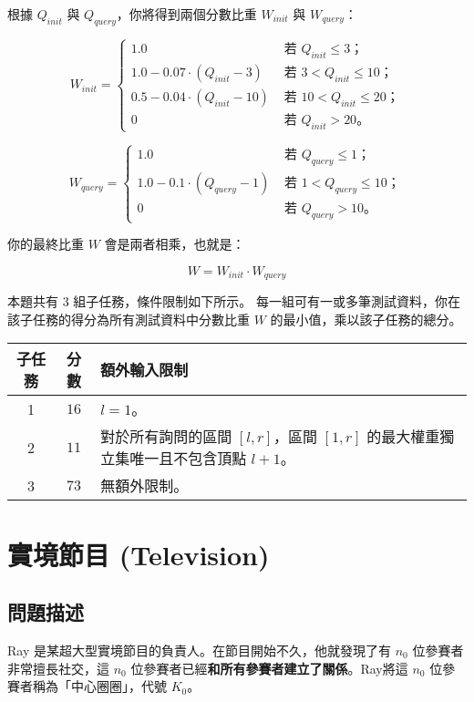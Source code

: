 根據 \(Q_{init}\) 與 \(Q_{query}\)，你將得到兩個分數比重 \(W_{init}\) 與
\(W_{query}\)：

\[
  W_{init} = \begin{cases}
  1.0 & \text{ 若 $Q_{init}\le 3$；}\\
  1.0 - 0.07 \cdot (Q_{init} - 3) & \text{ 若 $3 < Q_{init} \le 10$；}\\
  0.5 - 0.04 \cdot (Q_{init} - 10) & \text{ 若 $10 < Q_{init} \le 20$；}\\
  0 & \text{ 若 $Q_{init} > 20$。}
  \end{cases}
\]

\[
  W_{query} = \begin{cases}
  1.0 & \text{ 若 $Q_{query}\le 1$；}\\
  1.0 - 0.1 \cdot (Q_{query} - 1) & \text{ 若 $1 < Q_{query} \le 10$；}\\
  0 & \text{ 若 $Q_{query} > 10$。}
  \end{cases}
\]

你的最終比重 \(W\) 會是兩者相乘，也就是：

\[
W = W_{init}\cdot W_{query}
\]

本題共有 3 組子任務，條件限制如下所示。
每一組可有一或多筆測試資料，你在該子任務的得分為所有測試資料中分數比重
\(W\) 的最小值，乘以該子任務的總分。

\begin{longtable}[]{@{}ccl@{}}
\toprule
子任務 & 分數 & 額外輸入限制 \\
\midrule
\endhead
1 & \(16\) & \(l = 1\)。 \\
2 & \(11\) & 對於所有詢問的區間 \([l, r]\)，區間 \([1, r]\)
的最大權重獨立集唯一且不包含頂點 \(l + 1\)。 \\
3 & \(73\) & 無額外限制。 \\
\bottomrule
\end{longtable}

\section{實境節目 (Television)}

\subsection{問題描述}

Ray 是某超大型實境節目的負責人。在節目開始不久，他就發現了有 \(n_0\)
位參賽者非常擅長社交，這 \(n_0\)
位參賽者已經\textbf{和所有參賽者建立了關係}。Ray將這 \(n_0\)
位參賽者稱為「中心圈圈」，代號 \(K_0\)。

